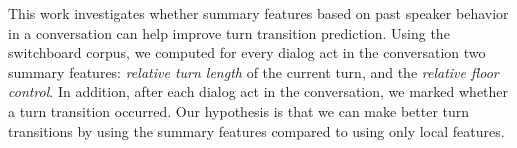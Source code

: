 This work investigates whether summary features based on past speaker behavior in a conversation can help improve turn transition prediction.
Using the switchboard corpus, we computed for every dialog act in the conversation two summary features: \textit{relative turn length} of the current turn, and the \textit{relative floor control}.
In addition, after each dialog act in the conversation, we marked whether a turn transition occurred. Our hypothesis is that we can make better
turn transitions by using the summary features compared to using only local features.
